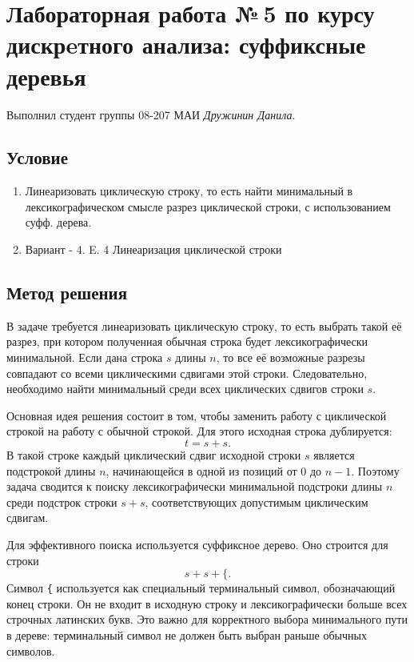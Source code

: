 \documentclass[12pt]{article}
\begin{document}
\section*{Лабораторная работа №\,5 по курсу дискрeтного анализа: суффиксные деревья}

Выполнил студент группы 08-207 МАИ \textit{Дружинин Данила}.

\subsection*{Условие}


\begin{enumerate}
\item Линеаризовать циклическую строку, то есть найти минимальный в лексикографическом смысле разрез циклической строки, с использованием суфф. дерева.
\item Вариант - 4. E. 4 Линеаризация циклической строки
\end{enumerate}

\subsection*{Метод решения}

В задаче требуется линеаризовать циклическую строку, то есть выбрать
такой её разрез, при котором полученная обычная строка будет
лексикографически минимальной. Если дана строка $s$ длины $n$, то все её
возможные разрезы совпадают со всеми циклическими сдвигами этой строки.
Следовательно, необходимо найти минимальный среди всех циклических
сдвигов строки $s$.

Основная идея решения состоит в том, чтобы заменить работу с циклической
строкой на работу с обычной строкой. Для этого исходная строка
дублируется:
\[
t = s + s.
\]
В такой строке каждый циклический сдвиг исходной строки $s$ является
подстрокой длины $n$, начинающейся в одной из позиций от $0$ до $n - 1$.
Поэтому задача сводится к поиску лексикографически минимальной подстроки
длины $n$ среди подстрок строки $s + s$, соответствующих допустимым
циклическим сдвигам.

Для эффективного поиска используется суффиксное дерево. Оно строится для
строки
\[
s + s + \texttt{\{}.
\]
Символ \texttt{\{} используется как специальный терминальный символ,
обозначающий конец строки. Он не входит в исходную строку и
лексикографически больше всех строчных латинских букв. Это важно для
корректного выбора минимального пути в дереве: терминальный символ не
должен быть выбран раньше обычных символов.
\end{document}
